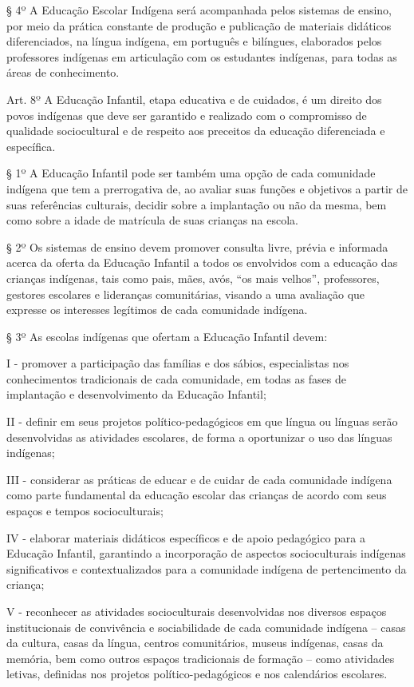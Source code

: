 \documentclass[
]{book}
\begin{document}
§ 4º A Educação Escolar Indígena será acompanhada pelos sistemas de ensino, por meio da prática constante de produção e publicação de materiais didáticos diferenciados, na língua indígena, em português e bilíngues, elaborados pelos professores indígenas em articulação com os estudantes indígenas, para todas as áreas de conhecimento.

Art. 8º A Educação Infantil, etapa educativa e de cuidados, é um direito dos povos indígenas que deve ser garantido e realizado com o compromisso de qualidade sociocultural e de respeito aos preceitos da educação diferenciada e específica.

§ 1º A Educação Infantil pode ser também uma opção de cada comunidade indígena que tem a prerrogativa de, ao avaliar suas funções e objetivos a partir de suas referências culturais, decidir sobre a implantação ou não da mesma, bem como sobre a idade de matrícula de suas crianças na escola.

§ 2º Os sistemas de ensino devem promover consulta livre, prévia e informada acerca da oferta da Educação Infantil a todos os envolvidos com a educação das crianças indígenas, tais como pais, mães, avós, ``os mais velhos'', professores, gestores escolares e lideranças comunitárias, visando a uma avaliação que expresse os interesses legítimos de cada comunidade indígena.

§ 3º As escolas indígenas que ofertam a Educação Infantil devem:

I - promover a participação das famílias e dos sábios, especialistas nos conhecimentos tradicionais de cada comunidade, em todas as fases de implantação e desenvolvimento da Educação Infantil;

II - definir em seus projetos político-pedagógicos em que língua ou línguas serão desenvolvidas as atividades escolares, de forma a oportunizar o uso das línguas indígenas;

III - considerar as práticas de educar e de cuidar de cada comunidade indígena como parte fundamental da educação escolar das crianças de acordo com seus espaços e tempos socioculturais;

IV - elaborar materiais didáticos específicos e de apoio pedagógico para a Educação Infantil, garantindo a incorporação de aspectos socioculturais indígenas significativos e contextualizados para a comunidade indígena de pertencimento da criança;

V - reconhecer as atividades socioculturais desenvolvidas nos diversos espaços institucionais de convivência e sociabilidade de cada comunidade indígena -- casas da cultura, casas da língua, centros comunitários, museus indígenas, casas da memória, bem como outros espaços tradicionais de formação -- como atividades letivas, definidas nos projetos político-pedagógicos e nos calendários escolares.
\end{document}
